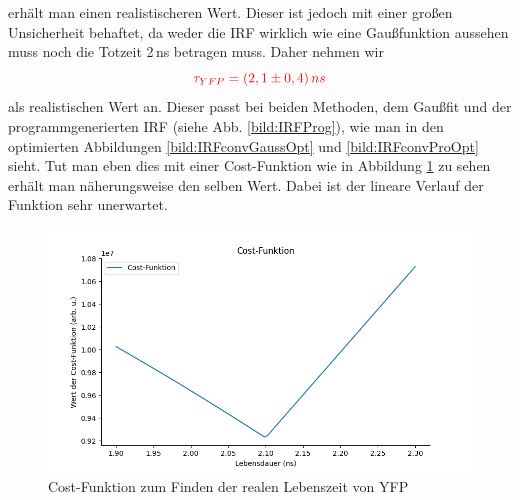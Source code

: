 erhält man einen realistischeren Wert. Dieser ist jedoch mit einer großen Unsicherheit behaftet, da weder die IRF wirklich wie eine 
Gaußfunktion aussehen muss noch die Totzeit 2\,ns betragen muss. Daher nehmen wir 
\begin{equation*}
    \textcolor{red}{\tau_{YFP} = (2,1\pm0,4)\,ns}
\end{equation*}
als realistischen Wert an. Dieser passt bei beiden Methoden, dem Gaußfit und der programmgenerierten IRF (siehe Abb. \ref{bild:IRFProg}), wie man in den optimierten Abbildungen \ref{bild:IRFconvGaussOpt} und \ref{bild:IRFconvProOpt} sieht.
Tut man eben dies mit einer Cost-Funktion wie in Abbildung \ref{bild:Cost} zu sehen erhält man näherungsweise den selben Wert. Dabei ist der lineare Verlauf der Funktion sehr unerwartet.

\begin{figure}[h]
    \centering
    \includegraphics[width = \linewidth]{Bilder/Auswertung/Cost.png}
    \caption{Cost-Funktion zum Finden der realen Lebenszeit von YFP}
    \label{bild:Cost}
\end{figure}



